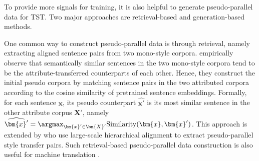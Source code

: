 \label{sec:pseudo_construct}
To provide more signals for training, it is also helpful to generate pseudo-parallel data for TST. Two major approaches are retrieval-based and generation-based methods.

One common way to construct pseudo-parallel data is through retrieval, namely extracting aligned sentence pairs from two mono-style corpora.  empirically observe that semantically similar sentences in the two mono-style corpora tend to be the attribute-transferred counterparts of each other. Hence, they construct the initial pseudo corpora by matching sentence pairs in the two attributed corpora according to the cosine similarity of pretrained sentence embeddings.
Formally, for each sentence $\bm{x}$, its pseudo counterpart $\widehat{\bm{x}'}$ is its most similar sentence in the other attribute corpus $\bm{X}'$, namely $\widehat{\bm{x}'}=\argmax_{\bm{x}'\in \bm{X}'} \mathrm{Similarity}(\bm{x}, \bm{x}')$. This approach is extended by  who use large-scale hierarchical alignment to extract pseudo-parallel style transfer pairs. 
Such retrieval-based pseudo-parallel data construction is also useful for machine translation .

